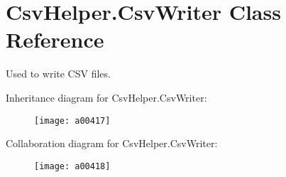 \hypertarget{a00078}{\section{Csv\-Helper.\-Csv\-Writer Class Reference}
\label{a00078}
}


Used to write C\-S\-V files.  




Inheritance diagram for Csv\-Helper.\-Csv\-Writer\-:
\nopagebreak
\begin{figure}[H]
\begin{center}
\leavevmode
\texttt{[image: a00417]}
\end{center}
\end{figure}


Collaboration diagram for Csv\-Helper.\-Csv\-Writer\-:
\nopagebreak
\begin{figure}[H]
\begin{center}
\leavevmode
\texttt{[image: a00418]}
\end{center}
\end{figure}
